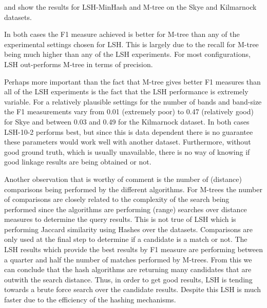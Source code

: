 \documentclass{llncs}
\begin{document}

 and  show the results for LSH-MinHash and M-tree on the Skye and Kilmarnock datasets. 

In both cases the F1 measure achieved is better for M-tree than any of the experimental settings chosen for LSH. This is largely due to the recall for M-tree being much higher than any of the LSH experiments. For most configurations, LSH out-performs M-tree in terms of precision.

Perhaps more important than the fact that M-tree gives better F1 measures than all of the LSH experiments is the fact that the LSH performance is extremely variable. For a relatively plausible settings for the number of bands and band-size the F1 measurements vary from 0.01 (extremely poor) to 0.47 (relatively good) for Skye and between 0.03 and 0.49 for the Kilmarnock dataset. In both cases LSH-10-2 performs best, but since this is data dependent there is no guarantee these parameters would work well with another dataset. Furthermore, without good ground truth, which is usually unavailable, there is no way of knowing if good linkage results are being obtained or not.

Another observation that is worthy of comment is the number of (distance) comparisons being performed by the different algorithms. For M-trees the number of comparisons are closely related to the complexity of the search being performed since the algorithms are performing (range) searches over distance measures to determine the query results. This is not true of LSH which is performing Jaccard similarity using Hashes over the datasets. Comparisons are only used at the final step to determine if a candidate is a match or not. The LSH results which provide the best results by F1 measure are performing between a quarter and half the number of matches performed by M-trees. From this we can conclude that the hash algorithms are returning many candidates that are outwith the search distance. Thus, in order to get good results, LSH is tending towards a brute force search over the candidate results. Despite this LSH is much faster due to the efficiency of the hashing mechanisms.

\end{document}
